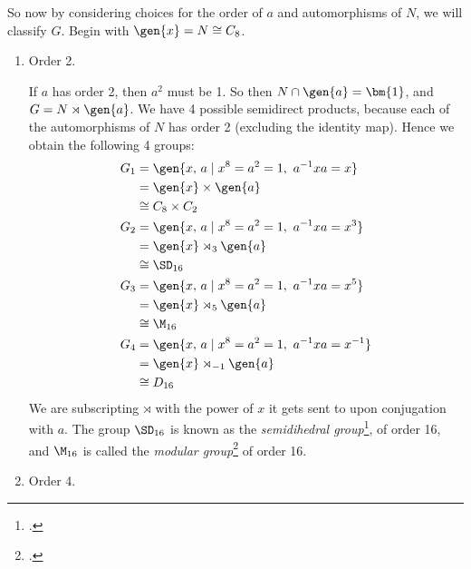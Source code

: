 So now by considering choices for the order of \(a\) and automorphisms of \(N\), we will classify \(G\).
Begin with \(\gen{x} = N \cong C_8\).

\begin{enumerate}
    \item Order 2.

        If \(a\) has order 2, then \(a^2\) must be 1.
        So then \(N \cap \gen{a} = \bm{1}\), and \(G = N \rtimes \gen{a}\).
        We have 4 possible semidirect products, because each of the automorphisms of \(N\) has order 2 (excluding the
        identity map).
        Hence we obtain the following 4 groups:
        \begin{equation*}
        \begin{aligned}
            G_1 &= \gen{x,\,a \mid x^8 = a^2 = 1,\ a^{-1}xa = x} \\
                &= \gen{x} \times \gen{a} \\
                &\cong C_8 \times C_2 \\
            G_2 &= \gen{x,\,a \mid x^8 = a^2 = 1,\ a^{-1}xa = x^{3}} \\
                &= \gen{x} \rtimes_3 \gen{a} \\
                &\cong \SD_{16}\\
            G_3 &= \gen{x,\,a \mid x^8 = a^2 = 1,\ a^{-1}xa = x^{5}} \\
                &= \gen{x} \rtimes_5 \gen{a} \\
                &\cong \M_{16}\\
            G_4 &= \gen{x,\,a \mid x^8 = a^2 = 1,\ a^{-1}xa = x^{-1}} \\
                &= \gen{x} \rtimes_{-1} \gen{a} \\
                &\cong D_{16}
        \end{aligned}
        \end{equation*}
        We are subscripting \(\rtimes\) with the power of \(x\) it gets sent to upon conjugation with \(a\).
        The group \(\SD_{16}\) is known as the \emph{semidihedral group}\footcite{semidihedral}, of order 16, and
        \(\M_{16}\) is called the \emph{modular group}\footcite{order16names} of order 16.

    \item Order 4.


\end{enumerate}
